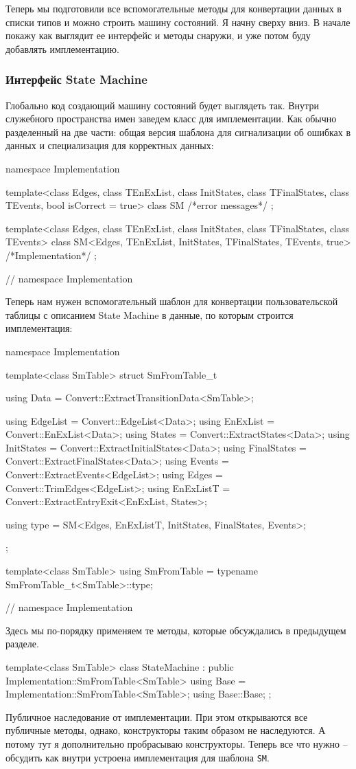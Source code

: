 \documentclass{article}
\begin{document}
{Теперь мы подготовили все вспомогательные методы для конвертации данных в списки типов и можно строить машину состояний.
Я начну сверху вниз.
В начале покажу как выглядит ее интерфейс и методы снаружи, и уже потом буду добавлять имплементацию.

\subsubsection{Интерфейс State Machine}

Глобально код создающий машину состояний будет выглядеть так.
Внутри служебного пространства имен заведем класс для имплементации.
Как обычно разделенный на две части: общая версия шаблона для сигнализации об ошибках в данных и специализация для корректных данных:
\begin{cppcode}
namespace Implementation {
template<class Edges, class TEnExList, class InitStates, class TFinalStates,
         class TEvents, bool isCorrect = true>
class SM {
  /*error messages*/
};

template<class Edges, class TEnExList, class InitStates, class TFinalStates,
         class TEvents>
class SM<Edges, TEnExList, InitStates, TFinalStates, TEvents, true> {
  /*Implementation*/
};
} // namespace Implementation
\end{cppcode}
Теперь нам нужен вспомогательный шаблон для конвертации пользовательской таблицы с описанием State Machine в данные, по которым строится имплементация:
\begin{cppcode}
namespace Implementation {
template<class SmTable>
struct SmFromTable_t {
  using Data = Convert::ExtractTransitionData<SmTable>;

  using EdgeList = Convert::EdgeList<Data>;
  using EnExList = Convert::EnExList<Data>;
  using States = Convert::ExtractStates<Data>;
  using InitStates = Convert::ExtractInitialStates<Data>;
  using FinalStates = Convert::ExtractFinalStates<Data>;
  using Events = Convert::ExtractEvents<EdgeList>;
  using Edges = Convert::TrimEdges<EdgeList>;
  using EnExListT = Convert::ExtractEntryExit<EnExList, States>;

  using type = SM<Edges, EnExListT, InitStates, FinalStates, Events>;
};

template<class SmTable>
using SmFromTable = typename SmFromTable_t<SmTable>::type;
} // namespace Implementation
\end{cppcode}
Здесь мы по-порядку применяем те методы, которые обсуждались в предыдущем разделе.
\begin{cppcode}
template<class SmTable>
class StateMachine : public Implementation::SmFromTable<SmTable> {
  using Base = Implementation::SmFromTable<SmTable>;
  using Base::Base;
};
\end{cppcode}
Публичное наследование от имплементации.
При этом открываются все публичные методы, однако, конструкторы таким образом не наследуются.
А потому тут я дополнительно пробрасываю конструкторы.
Теперь все что нужно -- обсудить как внутри устроена имплементация для шаблона \verb"SM".

}
\end{document}
